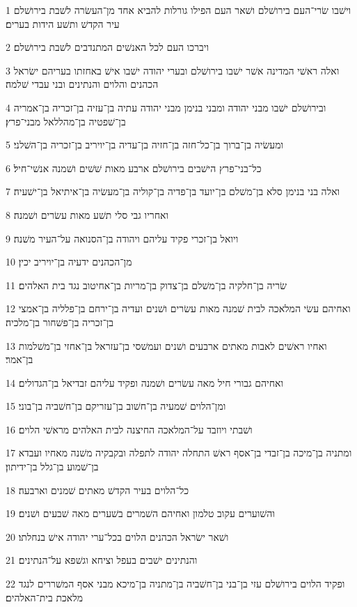 \par 1 וישׁבו שׂרי־העם בירושׁלם ושׁאר העם הפילו גורלות להביא אחד מן־העשׂרה לשׁבת בירושׁלם עיר הקדשׁ ותשׁע הידות בערים׃
\par 2 ויברכו העם לכל האנשׁים המתנדבים לשׁבת בירושׁלם׃
\par 3 ואלה ראשׁי המדינה אשׁר ישׁבו בירושׁלם ובערי יהודה ישׁבו אישׁ באחזתו בעריהם ישׂראל הכהנים והלוים והנתינים ובני עבדי שׁלמה׃
\par 4 ובירושׁלם ישׁבו מבני יהודה ומבני בנימן מבני יהודה עתיה בן־עזיה בן־זכריה בן־אמריה בן־שׁפטיה בן־מהללאל מבני־פרץ׃
\par 5 ומעשׂיה בן־ברוך בן־כל־חזה בן־חזיה בן־עדיה בן־יויריב בן־זכריה בן־השׁלני׃
\par 6 כל־בני־פרץ הישׁבים בירושׁלם ארבע מאות שׁשׁים ושׁמנה אנשׁי־חיל׃
\par 7 ואלה בני בנימן סלא בן־משׁלם בן־יועד בן־פדיה בן־קוליה בן־מעשׂיה בן־איתיאל בן־ישׁעיה׃
\par 8 ואחריו גבי סלי תשׁע מאות עשׂרים ושׁמנה׃
\par 9 ויואל בן־זכרי פקיד עליהם ויהודה בן־הסנואה על־העיר משׁנה׃
\par 10 מן־הכהנים ידעיה בן־יויריב יכין׃
\par 11 שׂריה בן־חלקיה בן־משׁלם בן־צדוק בן־מריות בן־אחיטוב נגד בית האלהים׃
\par 12 ואחיהם עשׂי המלאכה לבית שׁמנה מאות עשׂרים ושׁנים ועדיה בן־ירחם בן־פלליה בן־אמצי בן־זכריה בן־פשׁחור בן־מלכיה׃
\par 13 ואחיו ראשׁים לאבות מאתים ארבעים ושׁנים ועמשׁסי בן־עזראל בן־אחזי בן־משׁלמות בן־אמר׃
\par 14 ואחיהם גבורי חיל מאה עשׂרים ושׁמנה ופקיד עליהם זבדיאל בן־הגדולים׃
\par 15 ומן־הלוים שׁמעיה בן־חשׁוב בן־עזריקם בן־חשׁביה בן־בוני׃
\par 16 ושׁבתי ויוזבד על־המלאכה החיצנה לבית האלהים מראשׁי הלוים׃
\par 17 ומתניה בן־מיכה בן־זבדי בן־אסף ראשׁ התחלה יהודה לתפלה ובקבקיה משׁנה מאחיו ועבדא בן־שׁמוע בן־גלל בן־ידיתון׃
\par 18 כל־הלוים בעיר הקדשׁ מאתים שׁמנים וארבעה׃
\par 19 והשׁוערים עקוב טלמון ואחיהם השׁמרים בשׁערים מאה שׁבעים ושׁנים׃
\par 20 ושׁאר ישׂראל הכהנים הלוים בכל־ערי יהודה אישׁ בנחלתו׃
\par 21 והנתינים ישׁבים בעפל וציחא וגשׁפא על־הנתינים׃
\par 22 ופקיד הלוים בירושׁלם עזי בן־בני בן־חשׁביה בן־מתניה בן־מיכא מבני אסף המשׁררים לנגד מלאכת בית־האלהים׃
